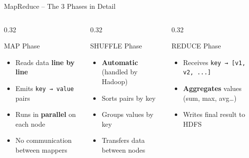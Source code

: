 \documentclass[aspectratio=169, 11pt]{beamer}
\begin{document}
\begin{frame}{MapReduce -- The 3 Phases in Detail}
  \begin{columns}[T]
    \begin{column}{0.32\textwidth}
      \begin{block}{ MAP Phase}
        \begin{itemize}
          \item Reads data \textbf{line by line}
          \item Emits \texttt{key → value} pairs
          \item Runs in \textbf{parallel} on each node
          \item No communication between mappers
        \end{itemize}
      \end{block}
    \end{column}
    \begin{column}{0.32\textwidth}
      \begin{block}{ SHUFFLE Phase}
        \begin{itemize}
          \item \textbf{Automatic} (handled by Hadoop)
          \item Sorts pairs by key
          \item Groups values by key
          \item Transfers data between nodes
        \end{itemize}
      \end{block}
    \end{column}
    \begin{column}{0.32\textwidth}
      \begin{block}{ REDUCE Phase}
        \begin{itemize}
          \item Receives \texttt{key → [v1, v2, ...]}
          \item \textbf{Aggregates} values (sum, max, avg\ldots)
          \item Writes final result to HDFS
        \end{itemize}
      \end{block}
    \end{column}
  \end{columns}
\end{frame}

\end{document}
